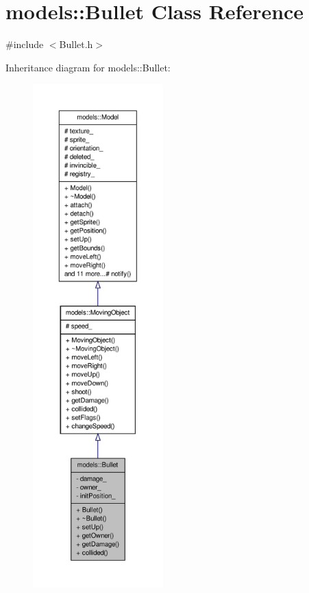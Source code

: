\hypertarget{classmodels_1_1Bullet}{\section{models\-:\-:\-Bullet \-Class \-Reference}
\label{d5/dd0/classmodels_1_1Bullet}
}


{\ttfamily \#include $<$\-Bullet.\-h$>$}



\-Inheritance diagram for models\-:\-:\-Bullet\-:
\nopagebreak
\begin{figure}[H]
\begin{center}
\leavevmode
\includegraphics[height=550pt]{d7/df3/classmodels_1_1Bullet__inherit__graph}
\end{center}
\end{figure}


